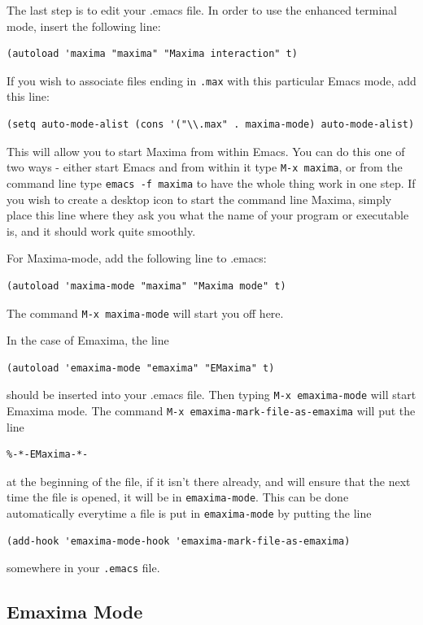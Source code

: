 The last step is to edit your .emacs file.  In order to use the enhanced terminal
mode, insert the following line:
\begin{verbatim}
(autoload 'maxima "maxima" "Maxima interaction" t)
\end{verbatim}
If you wish to associate files ending in \texttt{.max} with this particular
Emacs mode, add this line:
\begin{verbatim}
(setq auto-mode-alist (cons '("\\.max" . maxima-mode) auto-mode-alist)
\end{verbatim}
This will allow you to start Maxima from within Emacs.  You can do this
one of two ways - either start Emacs and from within it type \texttt{M-x maxima},
or from the command line type \texttt{emacs -f maxima} to have the whole thing
work in one step.  If you wish to create a desktop icon to start the command
line Maxima, simply place this line where they ask you what the name of your
program or executable is, and it should work quite smoothly.

For Maxima-mode, add the following line to .emacs:
\begin{verbatim}
(autoload 'maxima-mode "maxima" "Maxima mode" t)
\end{verbatim}
The command \texttt{M-x maxima-mode} will start you off here.

In the case of Emaxima, the line 
\begin{verbatim}
(autoload 'emaxima-mode "emaxima" "EMaxima" t)
\end{verbatim}
\noindent
should be inserted into your .emacs file.  Then typing
\texttt{M-x emaxima-mode} will start Emaxima mode.  The command 
\texttt{M-x emaxima-mark-file-as-emaxima} will put the line
\begin{verbatim}
%-*-EMaxima-*-
\end{verbatim}
\noindent
at the beginning of the file, if it isn't there already, and will ensure
that the next time the file is opened, it will be in \texttt{emaxima-mode}.  
This can be done automatically everytime a file is put in
\texttt{emaxima-mode} by putting the line
\begin{verbatim}
(add-hook 'emaxima-mode-hook 'emaxima-mark-file-as-emaxima)
\end{verbatim}
\noindent
somewhere in your \texttt{.emacs} file.

\subsection{Emaxima Mode}

